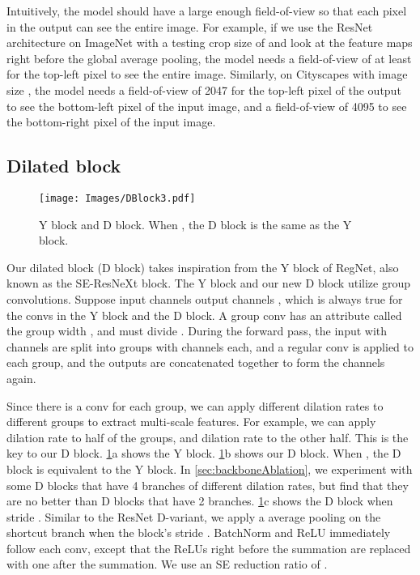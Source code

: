 \documentclass[10pt,twocolumn,letterpaper]{article}
\begin{document}
Intuitively, the model should have a large enough field-of-view so that each pixel in the output can see the entire image. For example, if we use the ResNet\cite{resnet} architecture on ImageNet with a testing crop size of  and look at the feature maps right before the global average pooling, the model needs a field-of-view of at least  for the top-left pixel to see the entire image. Similarly, on Cityscapes with image size , the model needs a field-of-view of 2047 for the top-left pixel of the output to see the bottom-left pixel of the input image, and a field-of-view of 4095 to see the bottom-right pixel of the input image. 



\subsection{Dilated block}
\begin{figure}
  \centering
    \texttt{[image: Images/DBlock3.pdf]}

   \caption{Y block and D block. When , the D block is the same as the Y block.}
   \label{fig:D block}
\end{figure}



Our dilated block (D block) takes inspiration from the Y block of RegNet\cite{regnet}, also known as the SE-ResNeXt block\cite{hu2018squeeze}. The Y block and our new D block utilize group convolutions. Suppose input channels  output channels , which is always true for the  convs in the Y block and the D block. A group conv has an attribute called the group width , and  must divide . During the forward pass, the input with  channels are split into  groups with  channels each, and a regular conv is applied to each group, and the outputs are concatenated together to form the  channels again.

Since there is a conv for each group, we can apply different dilation rates to different groups to extract multi-scale features. For example, we can apply dilation rate  to half of the groups, and dilation rate  to the other half. This is the key to our D block. \cref{fig:D block}a shows the Y block. \cref{fig:D block}b shows our D block. When , the D block is equivalent to the Y block. In \cref{sec:backboneAblation}, we experiment with some D blocks that have 4 branches of different dilation rates, but find that they are no better than D blocks that have 2 branches. \cref{fig:D block}c shows the D block when stride . Similar to the ResNet D-variant\cite{resnetd}, we apply a  average pooling on the shortcut branch when the block's stride . BatchNorm\cite{batchnorm} and ReLU immediately follow each conv, except that the ReLUs right before the summation are replaced with one after the summation. We use an SE\cite{hu2018squeeze} reduction ratio of .
\end{document}
